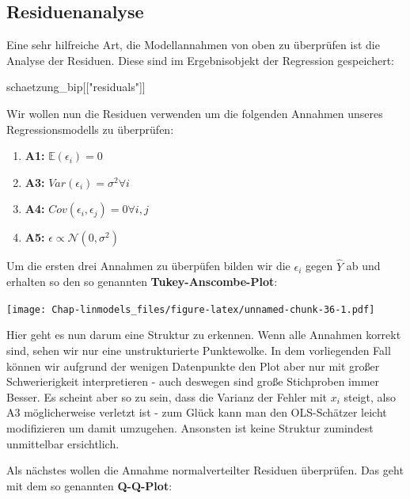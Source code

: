 \documentclass[]{book}
\newenvironment{Shaded}{\begin{snugshade}}{\end{snugshade}}
\newcommand{\StringTok}[1]{\textcolor[rgb]{0.31,0.60,0.02}{#1}}
\newcommand{\NormalTok}[1]{#1}
\begin{document}
\subsection{Residuenanalyse}\label{residuenanalyse}

Eine sehr hilfreiche Art, die Modellannahmen von oben zu überprüfen ist
die Analyse der Residuen. Diese sind im Ergebnisobjekt der Regression
gespeichert:

\begin{Shaded}
\begin{Highlighting}[]
\NormalTok{schaetzung_bip[[}\StringTok{"residuals"}\NormalTok{]]}
\end{Highlighting}
\end{Shaded}

Wir wollen nun die Residuen verwenden um die folgenden Annahmen unseres
Regressionsmodells zu überprüfen:

\begin{enumerate}
\def\labelenumi{\arabic{enumi}.}
\item
  \textbf{A1:} \(\mathbb{E}(\epsilon_i)=0\)
\item
  \textbf{A3: } \(Var(\epsilon_i)=\sigma^2\forall i\)
\item
  \textbf{A4: } \(Cov(\epsilon_i, \epsilon_j)=0 \forall i,j\)
\item
  \textbf{A5:} \(\epsilon \propto \mathcal{N}(0, \sigma^2)\)
\end{enumerate}

Um die ersten drei Annahmen zu überpüfen bilden wir die \(\epsilon_i\)
gegen \(\hat{Y}\) ab und erhalten so den so genannten
\textbf{Tukey-Anscombe-Plot}:

\texttt{[image: Chap-linmodels\_files/figure-latex/unnamed-chunk-36-1.pdf]}

Hier geht es nun darum eine Struktur zu erkennen. Wenn alle Annahmen
korrekt sind, sehen wir nur eine unstrukturierte Punktewolke. In dem
vorliegenden Fall können wir aufgrund der wenigen Datenpunkte den Plot
aber nur mit großer Schwerierigkeit interpretieren - auch deswegen sind
große Stichproben immer Besser. Es scheint aber so zu sein, dass die
Varianz der Fehler mit \(x_i\) steigt, also A3 möglicherweise verletzt
ist - zum Glück kann man den OLS-Schätzer leicht modifizieren um damit
umzugehen. Ansonsten ist keine Struktur zumindest unmittelbar
ersichtlich.

Als nächstes wollen die Annahme normalverteilter Residuen überprüfen.
Das geht mit dem so genannten \textbf{Q-Q-Plot}:
\end{document}
